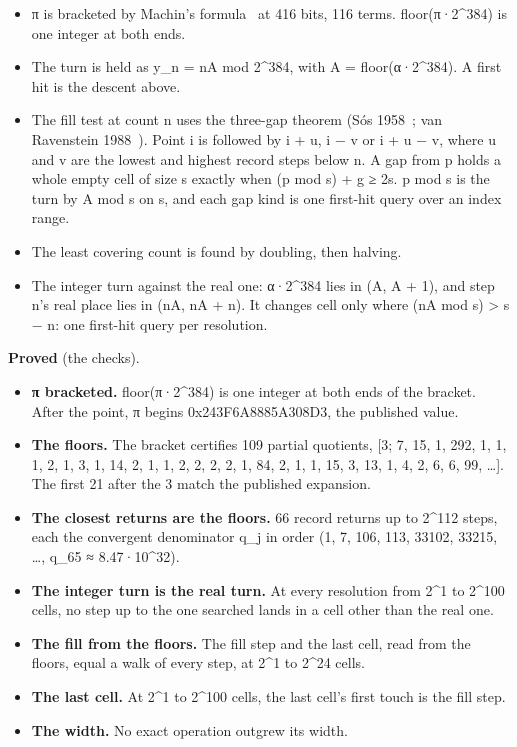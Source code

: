 \begin{itemize}
\item π is bracketed by Machin's formula~\cite{src:Jones-1706} at 416 bits, 116 terms. floor(π·2\textasciicircum{}384) is one integer at both ends.
\item The turn is held as y\_\allowbreak{}n = nA mod 2\textasciicircum{}384, with A = floor(α·2\textasciicircum{}384). A first hit is the descent above.
\item The fill test at count n uses the three-gap theorem (Sós 1958~\cite{src:S-s-1958}; van Ravenstein 1988~\cite{src:van-Ravenstein-1988}). Point i is followed by i + u, i − v or i + u − v, where u and v are the lowest and highest record steps below n. A gap from p holds a whole empty cell of size s exactly when (p mod s) + g ≥ 2s. p mod s is the turn by A mod s on s, and each gap kind is one first-hit query over an index range.
\item The least covering count is found by doubling, then halving.
\item The integer turn against the real one: α·2\textasciicircum{}384 lies in (A, A + 1), and step n's real place lies in (nA, nA + n). It changes cell only where (nA mod s) > s − n: one first-hit query per resolution.
\end{itemize}

\textbf{Proved} (the checks).

\begin{itemize}
\item \textbf{π bracketed.} floor(π·2\textasciicircum{}384) is one integer at both ends of the bracket. After the point, π begins 0x243F6A8885A308D3, the published value.
\item \textbf{The floors.} The bracket certifies 109 partial quotients, [3; 7, 15, 1, 292, 1, 1, 1, 2, 1, 3, 1, 14, 2, 1, 1, 2, 2, 2, 2, 1, 84, 2, 1, 1, 15, 3, 13, 1, 4, 2, 6, 6, 99, …]. The first 21 after the 3 match the published expansion.
\item \textbf{The closest returns are the floors.} 66 record returns up to 2\textasciicircum{}112 steps, each the convergent denominator q\_\allowbreak{}j in order (1, 7, 106, 113, 33102, 33215, …, q\_\allowbreak{}65 ≈ 8.47·10\textasciicircum{}32).
\item \textbf{The integer turn is the real turn.} At every resolution from 2\textasciicircum{}1 to 2\textasciicircum{}100 cells, no step up to the one searched lands in a cell other than the real one.
\item \textbf{The fill from the floors.} The fill step and the last cell, read from the floors, equal a walk of every step, at 2\textasciicircum{}1 to 2\textasciicircum{}24 cells.
\item \textbf{The last cell.} At 2\textasciicircum{}1 to 2\textasciicircum{}100 cells, the last cell's first touch is the fill step.
\item \textbf{The width.} No exact operation outgrew its width.
\end{itemize}

